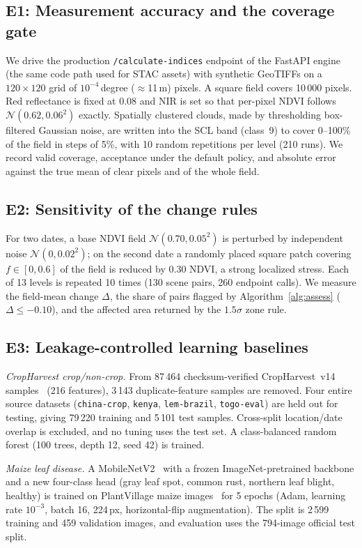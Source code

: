 \documentclass[conference]{IEEEtran}
\begin{document}
\subsection{E1: Measurement accuracy and the coverage gate}
We drive the production \texttt{/calculate-indices} endpoint of the FastAPI engine (the same code path used for STAC assets) with synthetic GeoTIFFs on a $120\times120$ grid of $10^{-4}$\,degree ($\approx$11\,m) pixels. A square field covers 10\,000 pixels. Red reflectance is fixed at 0.08 and NIR is set so that per-pixel NDVI follows $\mathcal{N}(0.62, 0.06^2)$ exactly. Spatially clustered clouds, made by thresholding box-filtered Gaussian noise, are written into the SCL band (class~9) to cover 0--100\% of the field in steps of 5\%, with 10 random repetitions per level (210 runs). We record valid coverage, acceptance under the default policy, and absolute error against the true mean of clear pixels and of the whole field.

\subsection{E2: Sensitivity of the change rules}
For two dates, a base NDVI field $\mathcal{N}(0.70,0.05^2)$ is perturbed by independent noise $\mathcal{N}(0,0.02^2)$; on the second date a randomly placed square patch covering $f\in[0,0.6]$ of the field is reduced by 0.30 NDVI, a strong localized stress. Each of 13 levels is repeated 10 times (130 scene pairs, 260 endpoint calls). We measure the field-mean change $\Delta$, the share of pairs flagged by Algorithm~\ref{alg:assess} ($\Delta\le-0.10$), and the affected area returned by the $1.5\sigma$ zone rule.

\subsection{E3: Leakage-controlled learning baselines}\label{sec:ml}
\textit{CropHarvest crop/non-crop.} From 87\,464 checksum-verified CropHarvest~v14 samples~\cite{tseng2021} (216 features), 3\,143 duplicate-feature samples are removed. Four entire source datasets (\texttt{china-crop}, \texttt{kenya}, \texttt{lem-brazil}, \texttt{togo-eval}) are held out for testing, giving 79\,220 training and 5\,101 test samples. Cross-split location/date overlap is excluded, and no tuning uses the test set. A class-balanced random forest (100 trees, depth 12, seed 42) is trained.

\textit{Maize leaf disease.} A MobileNetV2~\cite{sandler2018} with a frozen ImageNet-pretrained backbone and a new four-class head (gray leaf spot, common rust, northern leaf blight, healthy) is trained on PlantVillage maize images~\cite{hughes2015} for 5 epochs (Adam, learning rate $10^{-3}$, batch 16, 224\,px, horizontal-flip augmentation). The split is 2\,599 training and 459 validation images, and evaluation uses the 794-image official test split.
\end{document}
